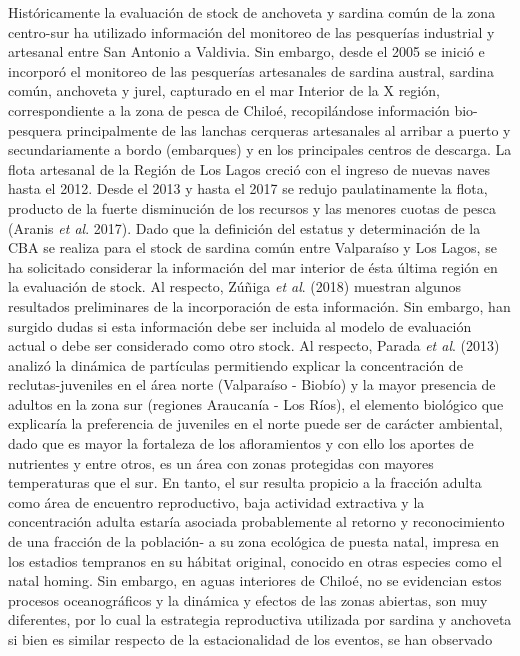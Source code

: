 \documentclass[
  spanish,
]{article}
\begin{document}
Históricamente la evaluación de stock de anchoveta y sardina común de la
zona centro-sur ha utilizado información del monitoreo de las pesquerías
industrial y artesanal entre San Antonio a Valdivia. Sin embargo, desde
el 2005 se inició e incorporó el monitoreo de las pesquerías artesanales
de sardina austral, sardina común, anchoveta y jurel, capturado en el
mar Interior de la X región, correspondiente a la zona de pesca de
Chiloé, recopilándose información bio-pesquera principalmente de las
lanchas cerqueras artesanales al arribar a puerto y secundariamente a
bordo (embarques) y en los principales centros de descarga. La flota
artesanal de la Región de Los Lagos creció con el ingreso de nuevas
naves hasta el 2012. Desde el 2013 y hasta el 2017 se redujo
paulatinamente la flota, producto de la fuerte disminución de los
recursos y las menores cuotas de pesca (Aranis \emph{et al}. 2017). Dado
que la definición del estatus y determinación de la CBA se realiza para
el stock de sardina común entre Valparaíso y Los Lagos, se ha solicitado
considerar la información del mar interior de ésta última región en la
evaluación de stock. Al respecto, Zúñiga \emph{et al}. (2018) muestran
algunos resultados preliminares de la incorporación de esta información.
Sin embargo, han surgido dudas si esta información debe ser incluida al
modelo de evaluación actual o debe ser considerado como otro stock. Al
respecto, Parada \emph{et al}. (2013) analizó la dinámica de partículas
permitiendo explicar la concentración de reclutas-juveniles en el área
norte (Valparaíso - Biobío) y la mayor presencia de adultos en la zona
sur (regiones Araucanía - Los Ríos), el elemento biológico que
explicaría la preferencia de juveniles en el norte puede ser de carácter
ambiental, dado que es mayor la fortaleza de los afloramientos y con
ello los aportes de nutrientes y entre otros, es un área con zonas
protegidas con mayores temperaturas que el sur. En tanto, el sur resulta
propicio a la fracción adulta como área de encuentro reproductivo, baja
actividad extractiva y la concentración adulta estaría asociada
probablemente al retorno y reconocimiento de una fracción de la
población- a su zona ecológica de puesta natal, impresa en los estadios
tempranos en su hábitat original, conocido en otras especies como el
natal homing. Sin embargo, en aguas interiores de Chiloé, no se
evidencian estos procesos oceanográficos y la dinámica y efectos de las
zonas abiertas, son muy diferentes, por lo cual la estrategia
reproductiva utilizada por sardina y anchoveta si bien es similar
respecto de la estacionalidad de los eventos, se han observado
\end{document}
